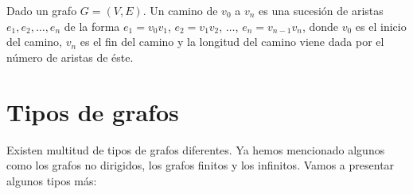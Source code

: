 \begin{defi} 
	Dado un grafo $G=(V,E)$. Un camino de $v_{0}$ a $v_{n}$ es una sucesión de aristas $e_{1},e_{2},\dots,e_{n}$ de la forma $e_{1}=v_{0}v_{1}$, $e_{2}=v_{1}v_{2}$, $\dots$, $e_{n}=v_{n-1}v_{n}$, donde $v_{0}$ es el inicio del camino, $v_{n}$ es el fin del camino y la longitud del camino viene dada por el número de aristas de éste.
\end{defi}

\section{Tipos de grafos}

Existen multitud de tipos de grafos diferentes. Ya hemos mencionado algunos como los grafos no dirigidos, los grafos finitos y los infinitos. Vamos a presentar algunos tipos más:

